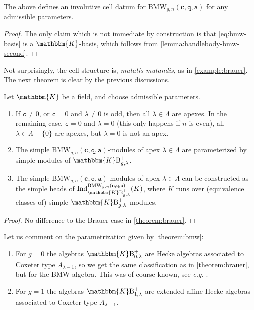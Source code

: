 \documentclass[a4paper,11pt]{amsart}
\newcommand{\eg}{\textsl{e.g.}}
\newcommand{\muta}{\textsl{mutatis mutandis}}
\newcommand{\setstuff}[1]{\mathrm{#1}}
\newcommand{\KK}{\mathbbm{K}}
\newcommand{\bsym}[1]{\boldsymbol{#1}}
\newcommand{\varsym}[1]{\mathtt{#1}}
\newcommand{\qvar}{\varsym{q}}
\newcommand{\cpar}{\bsym{c}}
\newcommand{\cvar}{\varsym{c}}
\newcommand{\avar}{\varsym{a}}
\numberwithin{equation}{section}
\let\fullref\autoref
\begin{document}
\begin{proposition}\label{proposition:bmw-basis}
The above defines an involutive 
cell datum for $\setstuff{BMW}_{g,n}(\cpar,\qvar,\avar)$ 
for any admissible parameters.
\end{proposition}

\begin{proof}
The only claim which is not immediate by construction is 
that \eqref{eq:bmw-basis} is a $\KK$-basis, which
follows from \fullref{lemma:handlebody-bmw-second}.
\end{proof}

Not surprisingly, the cell 
structure is, {\muta}, as in \fullref{example:brauer}.
The next theorem is 
clear by the previous discussions.

\begin{theorem}\label{theorem:bmw}
Let $\KK$ be a field, and choose admissible parameters.
\begin{enumerate}

\item If $\cvar\neq 0$, or $\cvar=0$ and $\lambda\neq 0$ is odd, 
then all $\lambda\in\Lambda$ are apexes. In the remaining case, 
$\cvar=0$ and $\lambda=0$ (this only happens if $n$ is even), all $\lambda\in\Lambda-\{0\}$ are apexes, but $\lambda=0$ is not an apex.

\item The simple $\setstuff{BMW}_{g,n}(\cpar,\qvar,\avar)$-modules of 
apex $\lambda\in\Lambda$ 
are parameterized by simple modules of $\KK\setstuff{B}_{g,\lambda}^{+}$.

\item The simple $\setstuff{BMW}_{g,n}(\cpar,\qvar,\avar)$-modules of 
apex $\lambda\in\Lambda$ can be constructed as 
the simple heads of
$\mathrm{Ind}_{\KK\setstuff{B}_{g,\lambda}^{+}}^{\setstuff{BMW}_{g,n}(\cpar,\qvar,\avar)}(K)$, 
where $K$ runs over (equivalence classes of) 
simple $\KK\setstuff{B}_{g,\lambda}^{+}$-modules.

\end{enumerate}
\end{theorem}

\begin{proof}
No difference to the Brauer case in \fullref{theorem:brauer}.
\end{proof}

\begin{example}
Let us comment on the parametrization given by 
\fullref{theorem:bmw}:
\begin{enumerate}

\item For $g=0$ the algebras $\KK\setstuff{B}_{0,\lambda}^{+}$ 
are Hecke algebras associated to Coxeter type 
$A_{\lambda-1}$, so we get the same classification 
as in \fullref{theorem:brauer}, but for the BMW algebra. 
This was of course known, see {\eg} \cite[Corollary 3.14]{Xi-bmw}.

\item For $g=1$ the algebras $\KK\setstuff{B}_{1,\lambda}^{+}$
are extended affine Hecke algebras associated to Coxeter type 
$A_{\lambda-1}$.

\end{enumerate}
\end{example}
\end{document}
